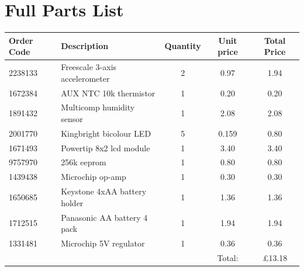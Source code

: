 \documentclass[a4paper,11pt]{article}  %
\begin{document}
\FloatBarrier

\section{Full Parts List}
\label{sec:full-parts-list}

\begin{tabular}{llccc}
  Order Code & Description & Quantity & Unit price & Total Price \\
  \hline
  2238133 & Freescale 3-axis accelerometer & 2 & 0.97 & 1.94 \\
  1672384 & AUX NTC 10k thermistor & 1 & 0.20 & 0.20 \\
  1891432 & Multicomp humidity sensor & 1 & 2.08 & 2.08 \\
  2001770 & Kingbright bicolour LED & 5 & 0.159 & 0.80 \\
  1671493 & Powertip 8x2 lcd module & 1 & 3.40 & 3.40 \\
  9757970 & 256k eeprom & 1 & 0.80 & 0.80 \\
  1439438 & Microchip op-amp & 1 & 0.30 & 0.30 \\
  1650685 & Keystone 4xAA battery holder & 1 & 1.36 & 1.36 \\
  1712515 & Panasonic AA battery 4 pack & 1 & 1.94 & 1.94 \\
  1331481 & Microchip 5V regulator & 1 & 0.36 & 0.36 \\
  \hline
  &&& Total: & \pounds 13.18
\end{tabular}




\end{document}
